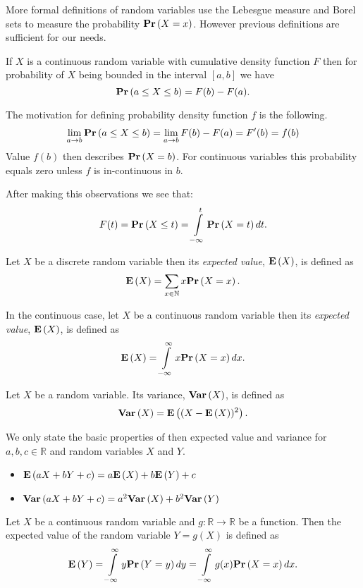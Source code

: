 More formal definitions of random variables use the Lebesgue measure and Borel sets to measure the probability $\mathbf{Pr}\left(X = x\right)$. However previous definitions are sufficient for our needs.

If $X$ is a continuous random variable with cumulative density function $F$ then for probability of $X$ being bounded in the interval $\left[a, b\right]$ we have
\[
\mathbf{Pr}\left(a \leq X \leq b\right) = F(b) - F(a) \text{.}
\]

The motivation for defining probability density function $f$ is the following.
\[
\lim\limits_{a \rightarrow b}\mathbf{Pr}\left(a \leq X \leq b\right) = \lim\limits_{a \rightarrow b} F(b) - F(a) = F'(b) = f(b)
\]
Value $f(b)$ then describes $\mathbf{Pr}\left(X = b\right)$. For continuous variables this probability equals zero unless $f$ is in-continuous in $b$.

After making this observations we see that:
\[
F(t) = \mathbf{Pr}\left(X \leq t\right) = \int\limits_{-\infty}^{t} \mathbf{Pr}\left(X = t\right) dt \text{.}
\]

\begin{definition}
Let $X$ be a discrete random variable then its \emph{expected value}, $\mathbf{E}\left(X\right)$,  is defined as
\[
\mathbf{E}\left(X\right) = \displaystyle\sum_{x \in \mathbb{N}} x \mathbf{Pr}\left(X = x\right) \text{.}
\]

In the continuous case, let $X$ be a continuous random variable then its \emph{expected value}, $\mathbf{E}\left(X\right)$, is defined as
\[
\mathbf{E}\left(X\right) = \int\limits_{-\infty}^{\infty} x \mathbf{Pr}\left(X = x\right) dx \text{.}
\]
\end{definition}

\begin{definition}[Variance]
Let $X$ be a random variable. Its variance, $\mathbf{Var}\left(X\right)$, is defined as \[ \mathbf{Var}\left(X\right) = \mathbf{E}\left((X - \mathbf{E}\left(X\right)) ^ 2\right) \text{.} \]
\end{definition}

We only state the basic properties of then expected value and variance for $a, b, c \in \mathbb{R}$ and random variables $X$ and $Y$.
\begin{itemize}
\item $\mathbf{E}\left(aX + bY + c\right) = a\mathbf{E}\left(X\right) + b\mathbf{E}\left(Y\right) + c$
\item $\mathbf{Var}\left(aX + bY + c\right) = a ^ 2 \mathbf{Var}\left(X\right) + b ^ 2 \mathbf{Var}\left(Y\right)$
\end{itemize}

\begin{definition}
\end{definition}
Let $X$ be a continuous random variable and $g: \mathbb{R} \rightarrow \mathbb{R}$ be a function. Then the expected value of the random variable $Y = g(X)$ is defined as
\[
\mathbf{E}\left(Y\right) = \int\limits_{-\infty}^{\infty} y\mathbf{Pr}\left(Y = y\right) dy = \int\limits_{-\infty}^{\infty} g(x)\mathbf{Pr}\left(X = x\right) dx \text{.}
\]

